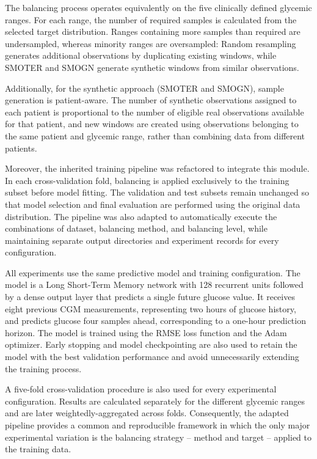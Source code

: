 The balancing process operates equivalently on the five clinically defined glycemic ranges. For each range, the number of required samples is calculated from the selected target distribution. Ranges containing more samples than required are undersampled, whereas minority ranges are oversampled: Random resampling generates additional observations by duplicating existing windows, while SMOTER and SMOGN generate synthetic windows from similar observations.

Additionally, for the synthetic approach (SMOTER and SMOGN), sample generation is patient-aware. The number of synthetic observations assigned to each patient is proportional to the number of eligible real observations available for that patient, and new windows are created using observations belonging to the same patient and glycemic range, rather than combining data from different patients.

Moreover, the inherited training pipeline was refactored to integrate this module. In each cross-validation fold, balancing is applied exclusively to the training subset before model fitting. The validation and test subsets remain unchanged so that model selection and final evaluation are performed using the original data distribution. The pipeline was also adapted to automatically execute the combinations of dataset, balancing method, and balancing level, while maintaining separate output directories and experiment records for every configuration.

All experiments use the same predictive model and training configuration. The model is a Long Short-Term Memory network with 128 recurrent units followed by a dense output layer that predicts a single future glucose value. It receives eight previous CGM measurements, representing two hours of glucose history, and predicts glucose four samples ahead, corresponding to a one-hour prediction horizon. The model is trained using the RMSE loss function and the Adam optimizer. Early stopping and model checkpointing are also used to retain the model with the best validation performance and avoid unnecessarily extending the training process.

A five-fold cross-validation procedure is also used for every experimental configuration. Results are calculated separately for the different glycemic ranges and are later weightedly-aggregated across folds. Consequently, the adapted pipeline provides a common and reproducible framework in which the only major experimental variation is the balancing strategy -- method and target -- applied to the training data.

